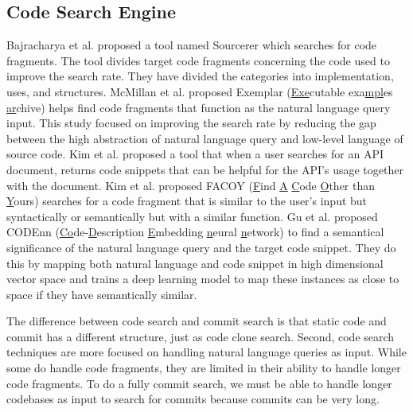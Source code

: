 \subsection{Code Search Engine}
Bajracharya et al. \cite{bajracharya2006sourcerer} proposed a tool named Sourcerer which searches for code fragments.
The tool divides target code fragments concerning the code used to improve the search rate.
They have divided the categories into implementation, uses, and structures.
McMillan et al. \cite{mcmillan2011exemplar} proposed Exemplar (\underline{Exe}cutable exa\underline{mpl}es \underline{ar}chive) helps find code fragments that function as the natural language query input.
This study focused on improving the search rate by reducing the gap between the high abstraction of natural language query and low-level language of source code.
Kim et al. \cite{kim2010towards} proposed a tool that when a user searches for an API document, returns code snippets that can be helpful for the API's usage together with the document.
Kim et al. \cite{kim2018facoy} proposed FACOY (\underline{F}ind \underline{A} \underline{C}ode \underline{O}ther than \underline{Y}ours) searches for a code fragment that is similar to the user's input but syntactically or semantically but with a similar function.
Gu et al. \cite{gu2018deep} proposed CODEnn (\underline{Co}de-\underline{D}escription \underline{E}mbedding \underline{n}eural \underline{n}etwork) to find a semantical significance of the natural language query and the target code snippet.
They do this by mapping both natural language and code snippet in high dimensional vector space and trains a deep learning model to map these instances as close to space if they have semantically similar.

The difference between code search and commit search is that static code and commit has a different structure, just as code clone search.
Second, code search techniques are more focused on handling natural language queries as input.
While some do handle code fragments, they are limited in their ability to handle longer code fragments. 
To do a fully commit search, we must be able to handle longer codebases as input to search for commits because commits can be very long.

